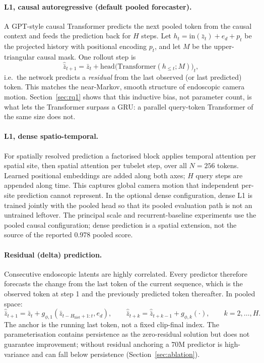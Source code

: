 \documentclass[preprint,12pt]{elsarticle}
\begin{document}
\paragraph{L1, causal autoregressive (default pooled forecaster).}
A GPT-style causal Transformer predicts the next pooled token from the causal context and feeds the prediction back for $H$ steps.
Let $h_t=\mathrm{in}(\bar z_t)+e_d+p_t$ be the projected history with positional encoding $p_t$, and let $M$ be the upper-triangular causal mask.
One rollout step is
\begin{equation}
\hat{\bar z}_{t+1}
=
\bar z_t
+
\mathrm{head}\bigl(
\mathrm{Transformer}(h_{\le t};M)
\bigr)_{t},
\label{eq:causal}
\end{equation}
i.e.\ the network predicts a \emph{residual} from the last observed (or last predicted) token.
This matches the near-Markov, smooth structure of endoscopic camera motion.
Section~\ref{sec:rq1} shows that this inductive bias, not parameter count, is what lets the Transformer surpass a GRU: a parallel query-token Transformer of the same size does not.

\paragraph{L1, dense spatio-temporal.}
For spatially resolved prediction a factorised block applies temporal attention per spatial site, then spatial attention per tubelet step, over all $N{=}256$ tokens.
Learned positional embeddings are added along both axes; $H$ query steps are appended along time.
This captures global camera motion that independent per-site prediction cannot represent.
In the optional dense configuration, dense L1 is trained jointly with the
pooled head so that its pooled evaluation path is not an untrained leftover.
The principal scale and recurrent-baseline experiments use the pooled causal
configuration; dense prediction is a spatial extension, not the source of the
reported 0.978 pooled score.

\paragraph{Residual (delta) prediction.}
Consecutive endoscopic latents are highly correlated.
Every predictor therefore forecasts the change from the last token of the
current sequence, which is the observed token at step 1 and the previously
predicted token thereafter. In pooled space:
\begin{equation}
\hat{\bar z}_{t+1}=\bar z_t+g_{\phi,1}(\bar z_{t-H_{\mathrm{hist}}+1:t},e_d),
\qquad
\hat{\bar z}_{t+k}=\hat{\bar z}_{t+k-1}+g_{\phi,k}(\cdot),
\qquad k=2,\ldots,H .
\label{eq:residual}
\end{equation}
The anchor is the running last token, not a fixed clip-final index.
The parameterisation contains persistence as the zero-residual solution but
does not guarantee improvement; without residual anchoring a $70$M predictor
is high-variance and can fall below persistence
(Section~\ref{sec:ablation}).
\end{document}
